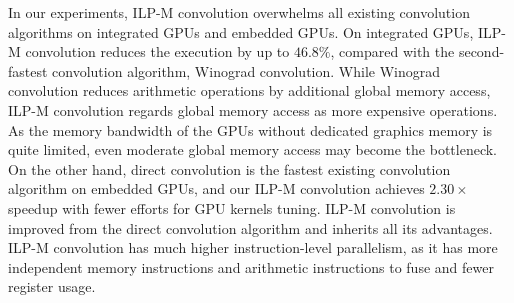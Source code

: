 \documentclass{article}
\begin{document}










In our experiments, ILP-M convolution overwhelms all existing convolution algorithms on integrated GPUs and embedded GPUs. On integrated GPUs, ILP-M convolution reduces the execution by up to $46.8\%$, compared with the second-fastest convolution algorithm, Winograd convolution. While Winograd convolution reduces arithmetic operations by additional global memory access, ILP-M convolution regards global memory access as more expensive operations. As the memory bandwidth of the GPUs without dedicated graphics memory is quite limited, even moderate global memory access may become the bottleneck. On the other hand, direct convolution is the fastest existing convolution algorithm on embedded GPUs, and our ILP-M convolution achieves $2.30 \times$ speedup with fewer efforts for GPU kernels tuning. ILP-M convolution is improved from the direct convolution algorithm and inherits all its advantages. ILP-M convolution has much higher instruction-level parallelism, as it has more independent memory instructions and arithmetic instructions to fuse and fewer register usage. 




\end{document}
